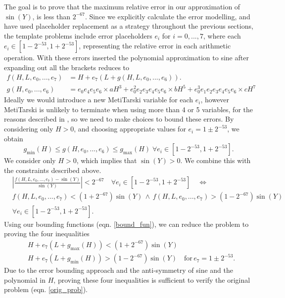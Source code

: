 \documentclass{fac}
\begin{document}
The goal is to prove that the maximum relative error in our approximation of $\sin{(Y)}$, is less than $2^{-67}$. Since we explicitly calculate the error modelling, and have used placeholder replacement as a strategy throughout the previous sections, the template problems include error placeholders $e_i$ for $i=0,...,7$, where each $e_i \in [1-2^{-53},1+2^{-53}]$, representing the relative error in each arithmetic operation. With these errors inserted the polynomial approximation to sine after expanding out all the brackets reduces to
\begin{align*}
    f(H,L, e_0,..., e_7) &= H + e_7(L + g(H,L, e_0,..., e_6)).\\
    g(H, e_0,..., e_6) &= e_0e_4e_5e_6\times aH^3 + e_0^2e_2e_3e_4e_5e_6\times bH^5 + e_0^3e_1e_2e_3e_4e_5e_6\times cH^7
\end{align*}
Ideally we would introduce a new MetiTarski variable for each $e_i$, however MetiTarski is unlikely to terminate when using more than 4 or 5 variables, for the reasons described in \cite{akbarpour2008metitarski}, so we need to make choices to bound these errors. By considering only $H>0$, and choosing appropriate values for $e_i=1\pm 2^{-53}$, we obtain 
\begin{equation} \label{bound_fun}
g_{\textrm{min}}(H) \leq g(H,e_0,...,e_6) \leq g_{\textrm{max}}(H) \; \forall e_i \in [1-2^{-53},1+2^{-53}].
\end{equation}
We consider only $H>0$, which implies that $\sin{(Y)}>0$. We combine this with the constraints described above. 
\begin{align}
    &\left|\frac{f(H,L, e_0,...,e_7)-\sin{(Y)}}{\sin{(Y)}}\right|<2^{-67} \quad \forall e_i \in [1-2^{-53},1+2^{-53}] \label{orig_prob} \quad \Leftrightarrow \\
    & f(H,L,e_0,...,e_7) < (1+2^{-67}) \sin{(Y)} \, \land \, f(H,L,e_0,...,e_7) > (1-2^{-67}) \sin{(Y)} 
    \\
    & \forall e_i \in [1-2^{-53},1+2^{-53}].
\end{align}
Using our bounding functions (eqn. \ref{bound_fun}), we can reduce the problem to proving the four inequalities
\begin{align}
    &H + e_7(L+g_{\textrm{max}}(H)) < (1+2^{-67}) \sin{(Y)}\label{upper_bound} \\
    &H + e_7(L+g_{\textrm{min}}(H)) > (1-2^{-67}) \sin{(Y)}\label{lower_bound} \quad \textrm{for}\,  e_7=1\pm2^{-53}.
\end{align}
Due to the error bounding approach and the anti-symmetry of sine and the polynomial in $H$, proving these four inequalities is sufficient to verify the original problem (eqn. \ref{orig_prob}).
\end{document}
